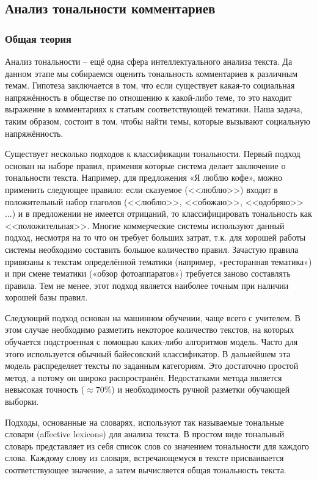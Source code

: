 \subsection{Анализ тональности комментариев}
\subsubsection{Общая теория}
Анализ тональности -- ещё одна сфера интеллектуального анализа текста. Да данном этапе мы собираемся оценить тональность комментариев к различным темам. Гипотеза заключается в том, что если существует какая-то социальная напряжённость в обществе по отношению к какой-либо теме, то это находит выражение в комментариях к статьям соответствующей тематики. Наша задача, таким образом, состоит в том, чтобы найти темы, которые вызывают социальную напряжённость.

Существует несколько подходов к классификации тональности. Первый подход основан на наборе правил, применяя которые система делает заключение о тональности текста. Например, для предложения «Я люблю кофе», можно применить следующее правило: если сказуемое (<<люблю>>) входит в положительный набор глаголов (<<люблю>>, <<обожаю>>, <<одобряю>> ...) и в предложении не имеется отрицаний, то классифицировать тональность как <<положительная>>. Многие коммерческие системы используют данный подход, несмотря на то что он требует больших затрат, т.к. для хорошей работы системы необходимо составить большое количество правил. Зачастую правила привязаны к текстам определённой тематики (например, «ресторанная тематика») и при смене тематики («обзор фотоаппаратов») требуется заново составлять правила. Тем не менее, этот подход является наиболее точным при наличии хорошей базы правил.

Следующий подход основан на машинном обучении, чаще всего с учителем. В этом случае необходимо разметить некоторое количество текстов, на которых обучается подстроенная с помощью каких-либо алгоритмов модель. Часто для этого используется обычный байесовский классификатор. В дальнейшем эта модель распределяет тексты по заданным категориям. Это достаточно простой метод, а потому он широко распространён. Недостатками метода является невысокая точность ($\approx70$\%) и необходимость ручной разметки обучающей выборки.

Подходы, основанные на словарях, используют так называемые тональные словари (affective lexicons) для анализа текста. В простом виде тональный словарь представляет из себя список слов со значением тональности для каждого слова. Каждому слову из словаря, встречающемуся в тексте присваивается соответствующее значение, а затем вычисляется общая тональность текста.


